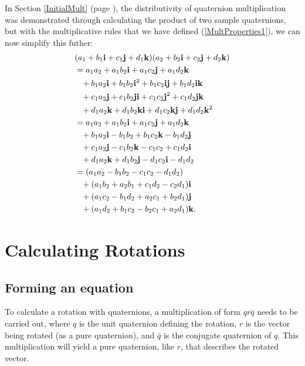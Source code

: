 \documentclass[10pt]{article}
\begin{document}
In Section \ref{InitialMult} (page \pageref{InitialMult}), the distributivity of quaternion multiplication was demonstrated through calculating the product of two sample quaternions, but with the multiplicative rules that we have defined (\ref{MultProperties1}), we can now simplify this futher:
\begin{equation}
    \begin{aligned}
        & (a_1 + b_1\vb{i} + c_1\vb{j} + d_1\vb{k})(a_2 + b_2\vb{i} + c_2\vb{j} + d_2\vb{k}) \\
        & = a_1a_2 + a_1b_2\vb{i} + a_1c_2\vb{j} + a_1d_2\vb{k} \\
        & \phantom{=} + b_1a_2\vb{i} + b_1b_2\vb{i}^2 + b_1c_2\vb{i}\vb{j} + b_1d_2\vb{i}\vb{k} \\
        & \phantom{=} + c_1a_2\vb{j} + c_1b_2\vb{j}\vb{i} + c_1c_2\vb{j}^2 + c_1d_2\vb{j}\vb{k} \\
        & \phantom{=} + d_1a_2\vb{k} + d_1b_2\vb{k}\vb{i} + d_1c_2\vb{k}\vb{j} + d_1d_2\vb{k}^2 \\
        & = a_1a_2 + a_1b_2\vb{i} + a_1c_2\vb{j} + a_1d_2\vb{k} \\
        & \phantom{=} + b_1a_2\vb{i} - b_1b_2 + b_1c_2\vb{k} - b_1d_2\vb{j} \\
        & \phantom{=} + c_1a_2\vb{j} - c_1b_2\vb{k} - c_1c_2 + c_1d_2\vb{i} \\
        & \phantom{=} + d_1a_2\vb{k} + d_1b_2\vb{j} - d_1c_2\vb{i} - d_1d_2  \\
        & = (a_1a_2 - b_1b_2 - c_1c_2 - d_1d_2) \\
        & \phantom{=} + (a_1b_2 + a_2b_1 + c_1d_2 - c_2d_1)\vb{i} \\
        & \phantom{=} + (a_1c_2 - b_1d_2 + a_2c_1 + b_2d_1)\vb{j} \\
        & \phantom{=} + (a_1d_2 + b_1c_2 - b_2c_1 + a_2d_1)\vb{k}.
    \end{aligned}
\end{equation}

\pagebreak
\section{Calculating Rotations}

\subsection{Forming an equation}

To calculate a rotation with quaternions, a multiplication of form $qr\bar{q}$ \cite{DRose} needs to be carried out, where $q$ is the unit quaternion defining the rotation, $r$ is the vector being rotated (as a pure quaternion), and $\bar{q}$ is the conjugate quaternion of $q$. This multiplication will yield a pure quaternion, like $r$, that describes the rotated vector.
\end{document}
